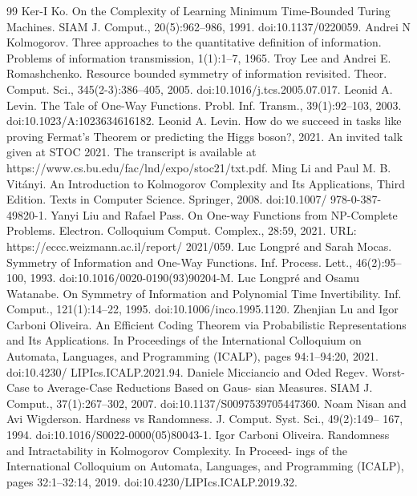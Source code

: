 \begin{thebibliography}{99}
 Ker-I Ko. On the Complexity of Learning Minimum Time-Bounded Turing Machines. SIAM J. Comput., 20(5):962–986, 1991. doi:10.1137/0220059.
 Andrei N Kolmogorov. Three approaches to the quantitative definition of information. Problems of information transmission, 1(1):1–7, 1965.
 Troy Lee and Andrei E. Romashchenko. Resource bounded symmetry of information revisited. Theor. Comput. Sci., 345(2-3):386–405, 2005. doi:10.1016/j.tcs.2005.07.017.
 Leonid A. Levin. The Tale of One-Way Functions. Probl. Inf. Transm., 39(1):92–103, 2003. doi:10.1023/A:1023634616182.
 Leonid A. Levin. How do we succeed in tasks like proving Fermat’s Theorem or predicting the Higgs boson?, 2021. An invited talk given at STOC 2021. The transcript is available at https://www.cs.bu.edu/fac/lnd/expo/stoc21/txt.pdf.
 Ming Li and Paul M. B. Vitányi. An Introduction to Kolmogorov Complexity and Its Applications, Third Edition. Texts in Computer Science. Springer, 2008. doi:10.1007/ 978-0-387-49820-1.
 Yanyi Liu and Rafael Pass. On One-way Functions from NP-Complete Problems. Electron. Colloquium Comput. Complex., 28:59, 2021. URL: https://eccc.weizmann.ac.il/report/ 2021/059.
 Luc Longpré and Sarah Mocas. Symmetry of Information and One-Way Functions. Inf. Process. Lett., 46(2):95–100, 1993. doi:10.1016/0020-0190(93)90204-M.
 Luc Longpré and Osamu Watanabe. On Symmetry of Information and Polynomial Time Invertibility. Inf. Comput., 121(1):14–22, 1995. doi:10.1006/inco.1995.1120.
 Zhenjian Lu and Igor Carboni Oliveira. An Efficient Coding Theorem via Probabilistic Representations and Its Applications. In Proceedings of the International Colloquium on Automata, Languages, and Programming (ICALP), pages 94:1–94:20, 2021. doi:10.4230/ LIPIcs.ICALP.2021.94.
 Daniele Micciancio and Oded Regev. Worst-Case to Average-Case Reductions Based on Gaus- sian Measures. SIAM J. Comput., 37(1):267–302, 2007. doi:10.1137/S0097539705447360.
 Noam Nisan and Avi Wigderson. Hardness vs Randomness. J. Comput. Syst. Sci., 49(2):149– 167, 1994. doi:10.1016/S0022-0000(05)80043-1.
 Igor Carboni Oliveira. Randomness and Intractability in Kolmogorov Complexity. In Proceed- ings of the International Colloquium on Automata, Languages, and Programming (ICALP), pages 32:1–32:14, 2019. doi:10.4230/LIPIcs.ICALP.2019.32.

\end{thebibliography}
